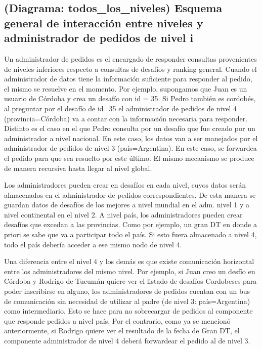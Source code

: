 \subsection{(Diagrama: todos_los_niveles) Esquema general de interacción entre niveles y administrador de pedidos de nivel i}

Un administrador de pedidos es el encargado de responder consultas provenientes de niveles inferiores respecto a consultas de desafíos y ranking general. Cuando el administrador de datos tiene la información suficiente para responder al pedido, el
mismo se resuelve en el momento. Por ejemplo, supongamos que Juan es un usuario de Córdoba y crea un desafío con id = 35.
Si Pedro también es cordobés, al preguntar por el desafío de id=35 el administrador de pedidos de nivel 4 (provincia=Córdoba) va a contar con la información necesaria para responder.
Distinto es el caso en el que Pedro consulta por un desafío que fue creado por un administrador a nivel nacional. En este caso, los datos van a ser manejados por el administrador de pedidos de nivel 3 (país=Argentina). En este caso, se forwardea el
pedido para que sea resuelto por este último.
El mismo mecanismo se produce de manera recursiva hasta llegar al nivel global.

Los administradores pueden crear en desafíos en cada nivel, cuyos datos serán almacenados en el administrador de pedidos
correspondientes. De esta manera se guardan datos de desafíos de los mejores a nivel mundial en el adm. nivel 1 y a nivel continental en el nivel 2. A nivel país, los administradores pueden crear desafíos que excedan a las provincias. Como por ejemplo, un gran DT en donde a priori se sabe que va a participar todo el país. Si esto fuera almacenado a nivel 4, todo el país debería acceder a ese mismo nodo de nivel 4.

Una diferencia entre el nivel 4 y los demás es que existe comunicación horizontal entre los administradores del mismo nivel. Por ejemplo, si Juan creo un desfío en Córdoba y Rodrigo de Tucumán quiere ver el listado de desafíos Cordobeses para poder inscribirse en alguno, los administradores de pedidos cuentan con un bus de comunicación sin necesidad de utilizar
al padre (de nivel 3: país=Argentina) como intermediario. Esto se hace para no sobrecargar de pedidos al componente
que responde pedidos a nivel país. Por el contrario, como ya se mencionó anteriormente, si Rodrigo quiere ver el resultado de la fecha de Gran DT, el componente administrador de nivel 4 deberá forwardear el pedido al de nivel 3.

